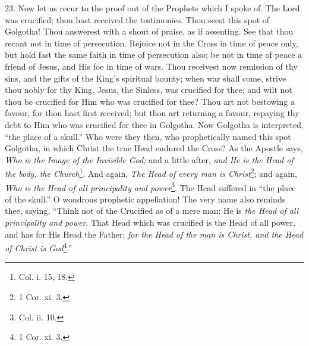 23. Now let us recur to the proof out of the Prophets which I spoke of. The Lord was crucified; thou hast received the testimonies. Thou seest this spot of Golgotha! Thou answerest with a shout of praise, as if assenting. See that thou recant not in time of persecution. Rejoice not in the Cross in time of peace only, but hold fast the same faith in time of persecution also; be not in time of peace a friend of Jesus, and His foe in time of wars. Thou receivest now remission of thy sins, and the gifts of the King’s spiritual bounty; when war shall come, strive thou nobly for thy King. Jesus, the Sinless, was crucified for thee; and wilt not thou be crucified for Him who was crucified for thee? Thou art not bestowing a favour, for thou hast first received; but thou art returning a favour, repaying thy debt to Him who was crucified for thee in Golgotha. Now Golgotha is interpreted, “the place of a skull.” Who were they then, who prophetically named this spot Golgotha, in which Christ the true Head endured the Cross? As the Apostle says, \emph{Who is the Image of the Invisible God;} and a little after, \emph{and He is the Head of the body, the Church}\footnote{Col. i. 15, 18.}. And again, \emph{The Head of every man is Christ}\footnote{1 Cor. xi. 3.}; and again, \emph{Who is the Head of all principality and power}\footnote{Col. ii. 10.}. The Head suffered in “the place of the skull.” O wondrous prophetic appellation! The very name also reminds thee, saying, “Think not of the Crucified as of a mere man; He is \emph{the Head of all principality and power}. That Head which was crucified is the Head of all power, and has for His Head the Father; \emph{for the Head of the man is Christ, and the Head of Christ is God}\footnote{1 Cor. xi. 3.}.”

